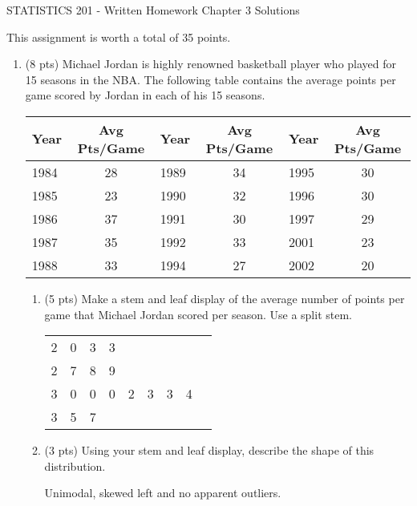 \documentclass{article}[11pt]
\begin{document}
\begin{center}
{\Large STATISTICS 201 - Written Homework Chapter 3 Solutions}\\[3mm]
\end{center}

\noindent 
This assignment is worth a total of 35 points.

\begin{enumerate}

\item (8 pts) Michael Jordan is highly renowned basketball player who played for 15 seasons in the NBA.  The following table contains the average points per game scored by Jordan in each of his 15 seasons.

\begin{center}
\begin{tabular}{|l|c||l|c||l|c|} \hline
Year & Avg Pts/Game & Year & Avg Pts/Game & Year & Avg Pts/Game 
\\ \hline
1984 & 28 & 1989 & 34 & 1995 & 30 \\
1985 & 23 & 1990 & 32 & 1996 & 30 \\
1986 & 37 & 1991 & 30 & 1997 & 29 \\
1987 & 35 & 1992 & 33 & 2001 & 23 \\
1988 & 33 & 1994 & 27 & 2002 & 20 \\ \hline
\end{tabular}
\end{center}

\begin{enumerate}
\item (5 pts) Make a stem and leaf display of the average number of points per game that Michael Jordan scored per season.  Use a split stem. \\
\begin{center}
\begin{tabular}{c|cccccccc}
2 & 0 & 3 & 3 \\ 
2 & 7 & 8 & 9 \\
3 & 0 & 0 & 0 & 2 & 3 & 3 & 4 \\
3 & 5 & 7 \\ 
\end{tabular}
\end{center}

\item (3 pts) Using your stem and leaf display, describe the shape of this distribution.

Unimodal, skewed left and no apparent outliers.
\end{enumerate}


\end{enumerate}
\end{document}
